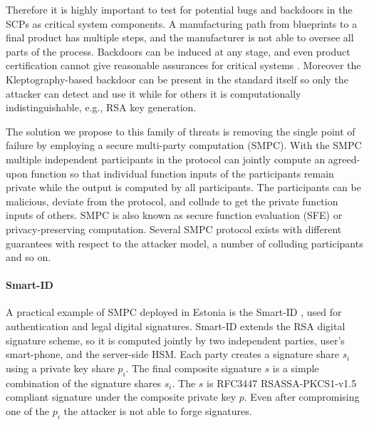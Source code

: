 \documentclass[
  digital, %
  twoside, %
  table,   %
  lof,     %
  lot,     %
]{fithesis3}
\newcounter{ph4_show_guides}
\theoremstyle{definition}
\theoremstyle{remark}
\begin{document}
\begin{ecmmnt}
    Therefore it is highly important to test for potential
    bugs and backdoors in the SCPs as critical system components. A manufacturing path from blueprints to a final product has multiple steps, and the manufacturer is not able to oversee all parts of the process. Backdoors can be induced at any stage, and even product certification cannot give reasonable assurances for critical systems \cite{2017-ccs-nemec}. Moreover the Kleptography-based \cite{Young:1997:KUC:1754542.1754551} backdoor can be present in the standard itself so only the attacker can detect and use it while for others it is computationally indistinguishable, e.g., RSA key generation. 
    
    The solution we propose to this family of threats is removing the single point of failure by employing a secure multi-party computation (SMPC). 
    With the SMPC multiple independent participants in the protocol can jointly compute an agreed-upon function so that individual function inputs of the participants remain private while the output is computed by all participants. The participants can be malicious, deviate from the protocol, and collude to get the private function inputs of others. SMPC is also known as secure function evaluation (SFE) or privacy-preserving computation. Several SMPC protocol exists with different guarantees with respect to the attacker model, a number of colluding participants and so on.
    
    \paragraph{Smart-ID} A practical example of SMPC deployed in Estonia is the Smart-ID \cite{smart_id_ee}, used for authentication and legal digital signatures. Smart-ID extends the RSA digital signature scheme, so it is computed jointly by two independent parties, user's smart-phone, and the server-side HSM. 
    Each party creates a signature share $s_i$ using a private key share $p_i$. The final composite signature $s$ is a simple combination of the signature shares $s_i$. 
    The $s$ is RFC3447 \cite{rfc3447} RSASSA-PKCS1-v1.5 compliant signature under the composite private key $p$. Even after compromising one of the $p_i$ the attacker is not able to forge signatures.



\end{ecmmnt}
\end{document}
